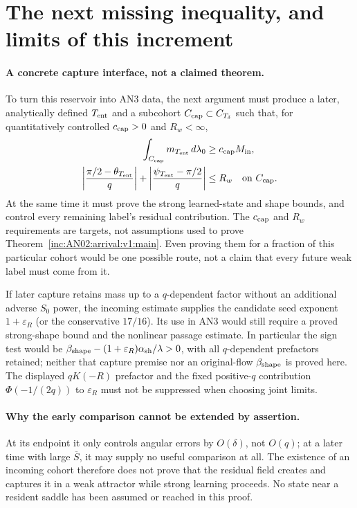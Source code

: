 \documentclass[11pt]{article}
\numberwithin{equation}{section}
\theoremstyle{remark}
\newcommand{\dd}{\,d}
\begin{document}
\section{The next missing inequality, and limits of this increment}
\label{inc:AN02:arrival:v1:next}

\paragraph{A concrete capture interface, not a claimed theorem.}
To turn this reservoir into AN3 data, the next argument must produce a
later, analytically defined $T_{\rm ent}$ and a subcohort
$C_{\rm cap}\subset C_{T_\delta}$ such that, for quantitatively controlled
$c_{\rm cap}>0$ and $R_w<\infty$,
\begin{align}
 \int_{C_{\rm cap}}m_{T_{\rm ent}}\dd\lambda_0
 &\ge c_{\rm cap}M_{\rm in},
 \label{inc:AN02:arrival:v1:openmass}\\
 \left|\frac{\pi/2-\theta_{T_{\rm ent}}}{q}\right|
 +\left|\frac{\psi_{T_{\rm ent}}-\pi/2}{q}\right|
 &\le R_w\quad\hbox{on }C_{\rm cap}.
 \label{inc:AN02:arrival:v1:openchart}
\end{align}
At the same time it must prove the strong learned-state and shape bounds,
and control every remaining label's residual contribution. The
$c_{\rm cap}$ and $R_w$ requirements are targets, not assumptions used to
prove Theorem~\ref{inc:AN02:arrival:v1:main}.
Even proving them for a fraction of this particular cohort would be one
possible route, not a claim that every future weak label must come from it.

If later capture retains mass up to a $q$-dependent factor without an
additional adverse $S_0$ power, the incoming estimate supplies the candidate
seed exponent $1+\varepsilon_R$ (or the conservative $17/16$).
Its use in AN3 would still require a proved strong-shape bound and the
nonlinear passage estimate. In particular the sign test would be
$\beta_{\rm shape}-(1+\varepsilon_R)\alpha_{\rm sh}/\lambda>0$,
with all $q$-dependent prefactors retained; neither that capture premise
nor an original-flow $\beta_{\rm shape}$ is proved here.
The displayed $qK(-R)$ prefactor and the fixed positive-$q$ contribution
$\Phi(-1/(2q))$ to $\varepsilon_R$ must not be suppressed when choosing
joint limits.

\paragraph{Why the early comparison cannot be extended by assertion.}
At its endpoint it only controls angular errors by $O(\delta)$, not
$O(q)$; at a later time with large $\overline S$, it may supply no useful
comparison at all. The existence of an incoming cohort therefore does
not prove that the residual field creates and captures it in a weak
attractor while strong learning proceeds. No state near a resident saddle
has been assumed or reached in this proof.
\end{document}
